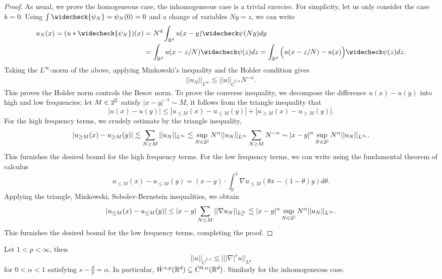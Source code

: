\begin{proof}
	As usual, we prove the homogeneous case, the inhomogeneous case is a trivial exercise. For simplicity, let us only consider the case $k = 0$. Using $\int \widecheck{\psi_N} = \psi_N (0) = 0$ and a change of variables $Ny = z$, we can write
		\begin{align*}
			u_N (x) = (u * \widecheck{\psi_N})(x) 
				&= N^d \int_{\R^d} u(x - y) \widecheck\psi (Ny) dy \\
				&= \int_{\R^d} u(x - z/N) \widecheck \psi (z) dz = \int_{\R^d} \Big( u(x - z/N) - u(x)\Big) \widecheck \psi (z) dz.
		\end{align*}	
	Taking the $L^\infty$-norm of the above, applying Minkowski's inequality and the Holder condition gives
		\begin{align*}
			||u_N||_{L^\infty} \lesssim ||u||_{\dot C^{0, \alpha}} N^{-\alpha} . 
		\end{align*}
	This proves the Holder norm controls the Besov norm. To prove the converse inequality, we decompose the difference $u(x) - u(y)$ into high and low frequencies; let $M \in 2^\mathbb Z$ satisfy $ |x - y|^{-1} \sim M$, it follows from the triangle inequality that
		\[ | u(x) - u(y)| \leq | u_{\leq M}(x) - u_{\leq M} (y)|+ | u_{\geq M}(x) - u_{\geq M} (y)|.  \]
	For the high frequency terms, we crudely estimate by the triangle inequality, 
		\[ | u_{\geq M} (x) - u_{\geq M}(y) | \lesssim \sum_{N\geq M} ||u_N||_{L^\infty} \lesssim \sup_{N \in 2^\mathbb Z} N^{\alpha} || u_N||_{L^\infty}  \sum_{N \geq M} N^{-\alpha} \sim  |x - y|^{\alpha} \sup_{N \in 2^\mathbb Z} N^\alpha || u_N||_{L^\infty}.\]	
	This furnishes the desired bound for the high frequency terms. For the low frequency terms, we can write using the fundamental theorem of calculus
		\[  u_{\leq M} (x) -  u_{\leq M} (y)  = (x - y) \cdot \int_0^1 \nabla u_{\leq M} (\theta x - (1 - \theta) y) d \theta. \]	
	Applying the triangle, Minkowski, Sobolev-Bernstein inequalities, we obtain
		\[ |u_{\leq M} (x) -  u_{\leq M} (y)| \leq |x - y| \sum_{N \leq M} ||\nabla u_{N}||_{L^\infty_x} \lesssim   |x - y|^{\alpha} \sup_{N \in 2^\mathbb Z} N^\alpha || u_N||_{L^\infty} . \]	
	This furnishes the desired bound for the low frequency terms, completing the proof. 		
\end{proof}



\begin{theorem}
	Let $1 < p < \infty$, then 
		\[ || u ||_{\dot C^{0, \alpha}} \lesssim |||\nabla|^s u||_{L^p}  \]
	for $0 < \alpha < 1$ satisfying $s - \tfrac{d}{p} = \alpha$. In particular, $\dot W^{s, p} (\mathbb R^d) \subseteq \dot C^{0, \alpha} (\mathbb R^d)$. Similarly for the inhomogeneous case. 
\end{theorem}

